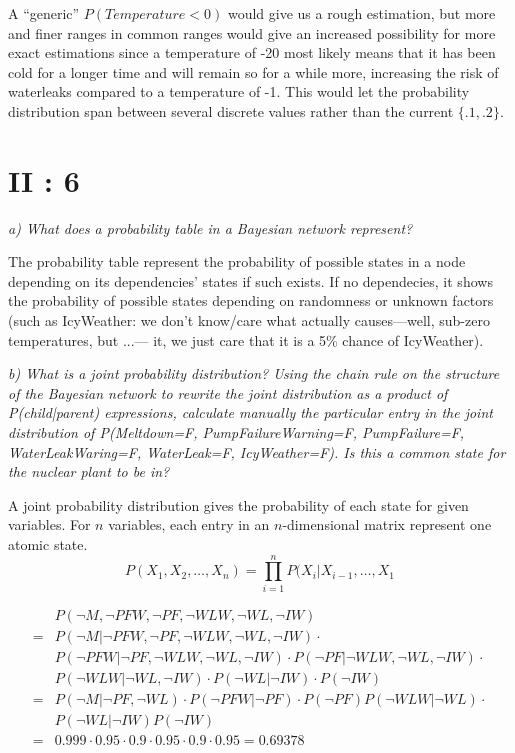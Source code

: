 A ``generic'' $P(Temperature < 0)$ would give us a rough estimation, but more and finer ranges in common ranges would give an increased possibility for more exact estimations since a temperature of -20 most likely means that it has been cold for a longer time and will remain so for a while more, increasing the risk of waterleaks compared to a temperature of -1. This would let the probability distribution span between several discrete values rather than the current $\{.1,.2\}$.

\section {II : 6}
\begin{framed}\em a) What does a probability table in a Bayesian network represent?\em\end{framed}
 The probability table represent the probability of possible states in a node depending on its dependencies' states if such exists. If no dependecies, it shows the probability of possible states depending on randomness or unknown factors (such as IcyWeather: we don't know/care what actually causes---well, sub-zero temperatures, but ...--- it, we just care that it is a 5\% chance of IcyWeather).

\begin{framed}\em b) What is a joint probability distribution? Using the chain rule on the structure of the Bayesian network to rewrite the joint distribution as a product of P(child|parent) expressions, calculate manually the particular entry in the joint distribution of P(Meltdown=F, PumpFailureWarning=F, PumpFailure=F, WaterLeakWaring=F, WaterLeak=F, IcyWeather=F). Is this a common state for the nuclear plant to be in?\em\end{framed}

A joint probability distribution gives the probability of each state for given variables. For $n$ variables, each entry in an $n$-dimensional matrix represent one atomic state.
$$  P(X_1,X_2,\dots,X_n) = \prod_{i=1}^{n} P(X_i|X_{i-1},\dots,X_1 $$

\begin{align*}
  & P(\neg M, \neg PFW, \neg PF, \neg WLW, \neg WL, \neg IW) \\
  = & P(\neg M|\neg PFW, \neg PF, \neg WLW, \neg WL, \neg IW)\cdot\\
  & P(\neg PFW | \neg PF, \neg WLW, \neg WL, \neg IW)\cdot P(\neg PF | \neg WLW, \neg WL, \neg IW)\cdot\\
  & P(\neg WLW | \neg WL, \neg IW)\cdot P(\neg WL | \neg IW)\cdot P(\neg IW)\\
  = & P(\neg M | \neg PF, \neg WL)\cdot P(\neg PFW | \neg PF)\cdot P(\neg PF)P(\neg WLW | \neg WL)\cdot
  \\ & P(\neg WL | \neg IW)P(\neg IW)\\
  = & 0.999\cdot0.95\cdot0.9\cdot0.95\cdot0.9\cdot0.95 = 0.69378
\end{align*}

